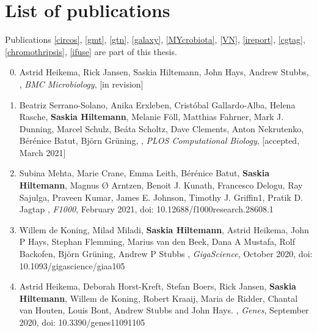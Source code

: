 \chapter{List of publications}
\label{AppendixD}

Publications \ref{circos}, \ref{gmt}, \ref{gtn}, \ref{galaxy}, \ref{MYcrobiota}, \ref{VN}, \ref{ireport}, \ref{cgtag}, \ref{chromothripsis}, \ref{ifuse} are part of this thesis.

\begin{enumerate}
\setcounter{enumi}{-1}

\item Astrid Heikema, Rick Jansen, Saskia Hiltemann, John Hays, Andrew Stubbs, {\color{chaptergrey}{WeFaceNano: a user-friendly pipeline for complete ONT sequence assembly and detection of antibiotic resistance in multi-plasmid bacterial isolates}}, \textit{BMC Microbiology}, [in revision]

\item  Beatriz Serrano-Solano, Anika Erxleben, Cristóbal Gallardo-Alba, Helena Rasche, \textbf{Saskia Hiltemann}, Melanie Föll, Matthias Fahrner, Mark J. Dunning, Marcel Schulz, Beáta Scholtz, Dave Clements, Anton Nekrutenko, Bérénice Batut, Björn Grüning, {\color{chaptergrey}{Fostering Accessible Online Education Using Galaxy as an e-learning Platform}}, \textit{PLOS Computational Biology}, [accepted, March 2021]

\item Subina Mehta, Marie Crane, Emma Leith, Bérénice Batut, \textbf{Saskia Hiltemann}, Magnus Ø Arntzen, Benoit J. Kunath, Francesco Delogu, Ray Sajulga, Praveen Kumar, James E. Johnson, Timothy J. Griffin1, Pratik D. Jagtap {\color{chaptergrey}{ASaiM-MT: a validated and optimized ASaiM workflow for metatranscriptomics analysis within Galaxy framework}}, \textit{F1000}, February 2021, doi: 10.12688/f1000research.28608.1

\item  Willem de Koning, Milad Miladi, \textbf{Saskia Hiltemann}, Astrid Heikema, John P Hays, Stephan Flemming, Marius van den Beek, Dana A Mustafa, Rolf Backofen, Björn Grüning, Andrew P Stubbs {\color{chaptergrey}{NanoGalaxy: Nanopore long-read sequencing data analysis in Galaxy}}, \textit{GigaScience}, October 2020, doi: 10.1093/gigascience/giaa105 \label{one}

\item Astrid Heikema, Deborah Horst-Kreft, Stefan Boers, Rick Jansen, \textbf{Saskia Hiltemann}, Willem de Koning, Robert Kraaij, Maria de Ridder, Chantal van Houten, Louis Bont, Andrew  Stubbs and John Hays. {\color{chaptergrey}{Comparison of Illumina versus Nanopore 16S rRNAGene Sequencing of the Human Nasal Microbiota}}, \textit{Genes}, September 2020, doi: 10.3390/genes11091105


\end{enumerate}
